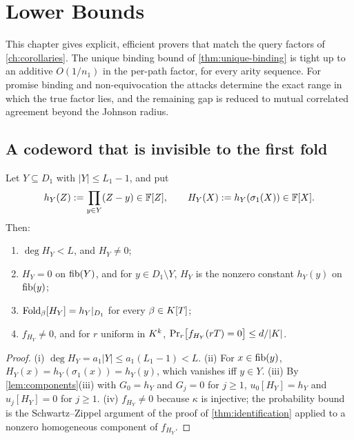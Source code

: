 \chapter{Lower Bounds}
\label{ch:lower-bounds}

This chapter gives explicit, efficient provers that match the query factors of
\cref{ch:corollaries}. The unique binding bound of \cref{thm:unique-binding} is tight up
to an additive $O(1/n_1)$ in the per-path factor, for every arity sequence. For promise
binding and non-equivocation the attacks determine the exact range in which the true
factor lies, and the remaining gap is reduced to mutual correlated agreement beyond the
Johnson radius.

\section{A codeword that is invisible to the first fold}

\begin{lemma}\label{lem:perturbation}
Let $Y\subseteq D_1$ with $|Y|\le L_1-1$, and put
\[
h_Y(Z):=\prod_{y\in Y}(Z-y)\in\mathbb{F}[Z],\qquad H_Y(X):=h_Y(\sigma_1(X))\in\mathbb{F}[X].
\]
Then:
\begin{enumerate}[label=\textup{(\roman*)}]
\item $\deg H_Y<L$, and $H_Y\ne0$;
\item $H_Y=0$ on $\mathrm{fib}(Y)$, and for $y\in D_1\setminus Y$, $H_Y$ is the nonzero constant
$h_Y(y)$ on $\mathrm{fib}(y)$;
\item $\mathrm{Fold}_\beta[H_Y]=h_Y|_{D_1}$ for every $\beta\in K[T]$;
\item $f_{H_Y}\ne0$, and for $r$ uniform in $K^k$,
$\Pr_r\bigl[f_{H_Y}(rT)=0\bigr]\le d/|K|$.
\end{enumerate}
\end{lemma}

\begin{proof}
(i) $\deg H_Y=a_1|Y|\le a_1(L_1-1)<L$. (ii) For $x\in\mathrm{fib}(y)$, $H_Y(x)=h_Y(\sigma_1(x))=h_Y(y)$,
which vanishes iff $y\in Y$. (iii) By \cref{lem:components}(iii) with $G_0=h_Y$ and
$G_j=0$ for $j\ge1$, $u_0[H_Y]=h_Y$ and $u_j[H_Y]=0$ for $j\ge1$. (iv) $f_{H_Y}\ne0$
because $\kappa$ is injective; the probability bound is the Schwartz--Zippel argument of
the proof of \cref{thm:identification} applied to a nonzero homogeneous component of
$f_{H_Y}$.
\end{proof}

